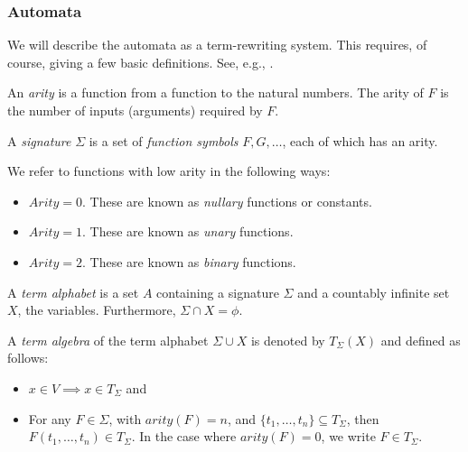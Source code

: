 \subsubsection{Automata} %
\label{ssub:automata}
We will describe the automata as a term-rewriting system. This requires, of course, giving a few
basic definitions. See, e.g., \cite{termrewriting2003}.
\begin{definition}\label{def:arity}
  An \emph{arity} is a function from a function to the natural numbers. The arity of $F$ is the
  number of inputs (arguments) required by $F$.
\end{definition}
\begin{definition}\label{def:automata-signature}
  A \emph{signature} $\Sigma$ is a set of \emph{function symbols} $F,G,\ldots$, each of which has
  an arity.
\end{definition}

\begin{remark}
  We refer to functions with low arity in the following ways:
  \begin{itemize}
    \item $Arity = 0$.  These are known as \emph{nullary} functions or constants.
    \item $Arity = 1$.  These are known as \emph{unary} functions.
    \item $Arity = 2$.  These are known as \emph{binary} functions.
  \end{itemize}
\end{remark}

\begin{definition}\label{def:term_alphabet}
  A \emph{term alphabet} is a set $A$ containing a signature $\Sigma$ and a countably infinite set
  $X$, the variables. Furthermore, $\Sigma \cap X = \phi$.
\end{definition}

\begin{definition}\label{def:term_algebra}
  A \emph{term algebra} of the term alphabet $\Sigma \cup X$ is denoted by $T_\Sigma(X)$ and
  defined as follows:
  \begin{itemize}
    \item $x\in V \implies x \in T_\Sigma$ and
    \item For any $F\in\Sigma$, with $arity(F) = n$, and $\{t_1,\ldots,t_n\} \subseteq T_\Sigma$,
    then $F(t_1,\ldots,t_n)\in T_\Sigma$. In the case where $arity(F) = 0$, we write
    $F \in T_\Sigma$.
  \end{itemize}
\end{definition}

